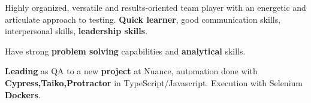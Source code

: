 \begin{cventries}
\begin{cvitemize}
 \item {Highly organized, versatile and results-oriented team player with an energetic and articulate approach to testing. \textbf{Quick learner}, good communication skills, interpersonal skills, \textbf{leadership skills}.}

 \item {Have strong \textbf{problem solving} capabilities and \textbf{analytical} skills.} 
 \item {\textbf{Leading} as QA to a new \textbf{project} at Nuance, automation done with \textbf{Cypress,Taiko,Protractor} in TypeScript/Javascript. Execution with Selenium \textbf{Dockers}.}
\end{cvitemize}
\end{cventries}
